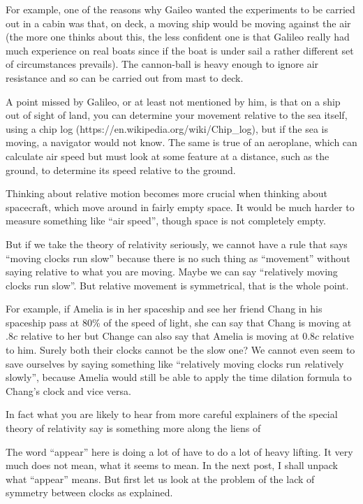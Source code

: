\documentclass[a4paper]{report}
\begin{document}
For example, one of the reasons why Gaileo wanted the experiments to be carried out in a cabin was that, on deck, a moving ship would be moving against the air (the more one thinks about this, the less confident one is that Galileo really had much experience on real boats since if the boat is under sail a rather different set of circumstances prevails). The cannon-ball is heavy enough to ignore air resistance and so can be carried out from mast to deck.

A point missed by Galileo, or at least not mentioned by him, is that on a ship out of sight of land, you can determine your movement relative to the sea itself, using a chip log (https://en.wikipedia.org/wiki/Chip_log), but if the sea is moving, a navigator would not know. The same is true of an aeroplane, which can calculate air speed but must look at some feature at a distance, such as the ground, to determine its speed relative to the ground.

Thinking about relative motion becomes more crucial when thinking about spacecraft, which move around in fairly empty space. It would be much harder to measure something like ``air speed'', though space is not completely empty.

But if we take the theory of relativity seriously, we cannot have a rule that says ``moving clocks run slow'' because there is no such thing as ``movement'' without saying relative to what you are moving. Maybe we can say ``relatively moving clocks run slow''. But relative movement is symmetrical, that is the whole point. 

For example, if Amelia is in her spaceship and see her friend Chang in his spaceship pass at 80\% of the speed of light, she can say that Chang is moving at $.8c$ relative to her but Change can also say that Amelia is moving at $0.8c$ relative to him. Surely both their clocks cannot be the slow one? We cannot even seem to save ourselves by saying something like ``relatively moving clocks run {\emph relatively} slowly'', because Amelia would still be able to apply the time dilation formula to Chang's clock and vice versa.

In fact what you are likely to hear from more careful explainers of the special theory of relativity say is something more along the liens of 


The word ``appear'' here is doing a lot of have to do a lot of heavy lifting. It very much does not mean, what it seems to mean. In the next post, I shall unpack what ``appear'' means. But first let us look at the problem of the lack of symmetry between clocks as explained.
\end{document}
